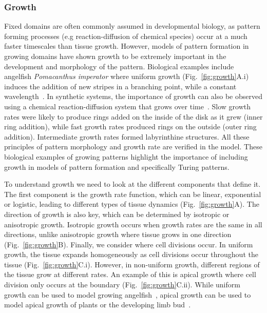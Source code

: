  \subsubsection{Growth}\label{growth_intro}
Fixed domains are often commonly assumed in developmental biology, as pattern forming processes (e.g reaction-diffusion of chemical species) occur at a much faster timescales than tissue growth. %
However, models of pattern formation in growing domains have shown growth to be extremely important in the development and morphology of the pattern.
Biological examples include angelﬁsh \textit{Pomacanthus imperator} where uniform growth (Fig.~\ref{fig:growth}A.i) induces the addition of new stripes in a branching point, while a constant wavelength~\parencite{Kondo1995}.
In synthetic systems, the importance of growth can also be observed using a chemical reaction-diffusion system that grows over time~\parencite{Konow2019}.
Slow growth rates were likely to produce rings added on the inside of the disk as it grew (inner ring addition), while fast growth rates produced rings on the outside (outer ring addition).
Intermediate growth rates formed labyrinthine structures.
All these principles of pattern morphology and growth rate are verified in the model.
These biological examples of growing patterns highlight the importance of including growth in models of pattern formation and specifically Turing patterns.

To understand growth we need to look at the different components that define it.
The first component is the growth rate function, which can be linear, exponential or logistic, leading to different types of tissue dynamics (Fig.~\ref{fig:growth}A).
The direction of growth is also key, which can be determined by isotropic or anisotropic growth.
Isotropic growth occurs when growth rates are the same in all directions, unlike anisotropic growth where tissue grows in one direction (Fig.~\ref{fig:growth}B).
Finally, we consider where cell divisions occur.
In uniform growth, the tissue expands homogeneously as cell divisions occur throughout the tissue (Fig.~\ref{fig:growth}C.i).
However, in non-uniform growth, different regions of the tissue grow at different rates.
An example of this is apical growth where cell division only occurs at the boundary (Fig.~\ref{fig:growth}C.ii).
While uniform growth can be used to model growing angelfish~\parencite{Kondo1995}, apical growth can be used to model apical growth of plants or the developing limb bud~\parencite{crampin2002pattern}.


